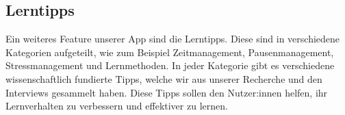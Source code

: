 \documentclass[12pt,a4paper]{report}
\begin{document}
\subsection{Lerntipps}
Ein weiteres Feature unserer App sind die Lerntipps. Diese sind in verschiedene Kategorien aufgeteilt, wie zum Beispiel Zeitmanagement, Pausenmanagement, Stressmanagement und Lernmethoden. In jeder Kategorie gibt es verschiedene wissenschaftlich fundierte Tipps, welche wir aus unserer Recherche und den Interviews gesammelt haben. Diese Tipps sollen den Nutzer:innen helfen, ihr Lernverhalten zu verbessern und effektiver zu lernen.

\clearpage
\clearpage
{} %
\nocite{*}
\printbibliography[title={Literaturverzeichnis}]
\end{document}
